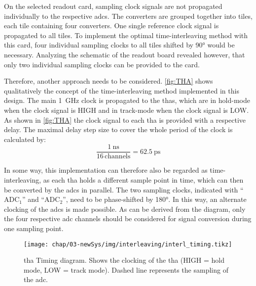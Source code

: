 On the selected readout card, sampling clock signals are not propagated individually to the respective \glspl{adc}.
The converters are grouped together into tiles, each tile containing four converters.
One single reference clock signal is propagated to all tiles. 
To implement the optimal time-interleaving method with this card, four individual sampling clocks to all tiles shifted by \ang{90} would be necessary.
Analyzing the schematic of the readout board revealed however, that only two individual sampling clocks can be provided to the card.

Therefore, another approach needs to be considered.
\autoref{fig:THA} shows qualitatively the concept of the time-interleaving method implemented in this design.
The main \SI{1}{\GHz} clock is propagated to the \glspl{tha}, which are in hold-mode when the clock signal is HIGH and in track-mode when the clock signal is LOW.
As shown in \autoref{fig:THA} the clock signal to each \gls{tha} is provided with a respective delay.
The maximal delay step size to cover the whole period of the clock is calculated by: 
\begin{equation}
	\frac{\SI{1}{\nano\second}}{16 \, \text{channels}} = \SI{62.5}{\pico\second}
\end{equation}

In some way, this implementation can therefore also be regarded as time-interleaving, as each \gls{tha} holds a different sample point in time, which can then be converted by the \glspl{adc} in parallel.
The two sampling clocks, indicated with ``$\text{ADC}_1$'' and ``$\text{ADC}_2$'', need to be phase-shifted by \ang{180}.
In this way, an alternate clocking of the \glspl{adc} is made possible.
As can be derived from the diagram, only the four respective \gls{adc} channels should be considered for signal conversion during one sampling point.

\begin{sidewaysfigure}[tbh]
	\centering
	\tikzexternaldisable
	\texttt{[image: chap/03-newSys/img/interleaving/interl\_timing.tikz]}
	\tikzexternalenable
	\caption[Track-And-Hold Timing diagram]{\gls{tha} Timing diagram. Shows the clocking of the \gls{tha} (HIGH = hold mode, LOW = track mode). Dashed line represents the sampling of the \gls{adc}.}
	\label{fig:THA}
\end{sidewaysfigure}

 
